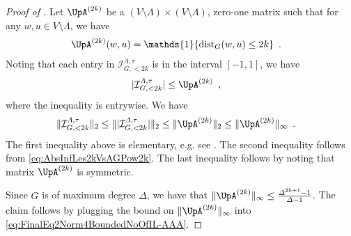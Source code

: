 \documentclass[11pt,reqno]{amsart}
\numberwithin{equation}{section}
\newcommand{\cI}{{\mathcal{I}}}
\newcommand{\blue}[1]{{\color{blue}#1}}
\newcommand{\bluepigment}[1]{{\color{blue(pigment)}#1}}
\newcommand{\goldenbrown}[1]{{\color{goldenbrown}#1}}
\newcommand{\red}[1]{{\color{red}#1}}
\newcommand{\Ind}{\mathds{1}}
\newcommand{\dist}{{\rm dist}}
\newcommand{\maxDeg}{{\Delta}}
\newcommand{\infmatrix}{\cI}
\newcommand{\norm}[2]{\goldenbrown{\|} #1 \goldenbrown{\|}_{#2}}
\newcommand{\abs}[1]{\blue{|}#1\blue{|}}
\newcommand{\Adjacency}{{\UpA}}
\newcommand{\spreadpoint}{\newpage}
\renewcommand{\spreadpoint}{}
\renewcommand{\blue}[1]{#1}
\renewcommand{\bluepigment}[1]{#1}
\renewcommand{\goldenbrown}[1]{#1}
\renewcommand{\red}[1]{#1}
\newcommand{\kk}{\bluepigment{k}}
\newcommand{\ku}{\red{u}}
\newcommand{\kw}{\blue{w}}
\renewcommand{\kk}{k}
\renewcommand{\ku}{u}
\renewcommand{\kw}{w}
\begin{document}
\begin{proof}[Proof of ]
Let $\Adjacency^{(2\kk)}$ be a  $(V\setminus \Lambda)\times (V\setminus \Lambda)$,  zero-one matrix  such that 
for any $\kw,\ku\in V\setminus \Lambda$,  we have
\begin{align}
\Adjacency^{(2\kk)}(\kw,\ku)&=\Ind\{\dist_{G}(\kw,\ku)\leq 2\kk\}\enspace. 
\end{align}
Noting that each entry in $\infmatrix^{\Lambda,\tau}_{G, <2\kk}$ is in the interval $[-1,1]$, we have
\begin{align}\label{eq:AbsInfLes2kVsAGPow2k}
\abs{\infmatrix^{\Lambda,\tau}_{G, <2\kk}} &\leq \Adjacency^{(2\kk)}\enspace,
\end{align}
where the inequality is entrywise. We have
\begin{align}\label{eq:FinalEq2Norm4BoundedNoOfIL-AAA}
\norm{\infmatrix^{\Lambda,\tau}_{G, <2\kk}}{2}&\leq \norm{ \abs{\infmatrix^{\Lambda,\tau}_{G, <2\kk}} }{2} \leq 
\norm{\Adjacency^{(2\kk)}}{2} \leq \norm{\Adjacency^{(2\kk)}}{\infty}\enspace.  
\end{align}
The first inequality above is elementary, e.g. see . The second inequality follows from 
\eqref{eq:AbsInfLes2kVsAGPow2k}.  The last inequality follows by noting that matrix $\Adjacency^{(2\kk)}$ is symmetric. 

Since $G$ is of maximum degree $\maxDeg$, we have that $\norm{\Adjacency^{(2\kk)}}{\infty}\leq \frac{\maxDeg^{2\kk+1}-1}{\maxDeg-1}$. 
The claim follows by plugging the bound on $\norm{\Adjacency^{(2\kk)}}{\infty}$ into \eqref{eq:FinalEq2Norm4BoundedNoOfIL-AAA}.
\end{proof}







\spreadpoint
\newpage
\end{document}
